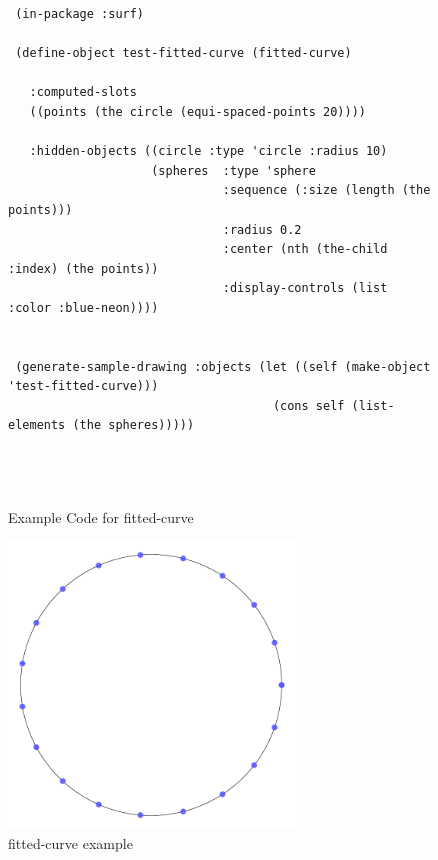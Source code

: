 \documentclass [11pt]{book}
\begin{document}
\begin{itemize}
\begin{figure}
\begin{lrbox}{\boxedverb}
\begin{minipage}{\linewidth}
{\begin{verbatim}
 (in-package :surf)

 (define-object test-fitted-curve (fitted-curve) 
  
   :computed-slots
   ((points (the circle (equi-spaced-points 20))))

   :hidden-objects ((circle :type 'circle :radius 10)
                    (spheres  :type 'sphere
                              :sequence (:size (length (the points)))
                              :radius 0.2
                              :center (nth (the-child :index) (the points))
                              :display-controls (list :color :blue-neon))))


 (generate-sample-drawing :objects (let ((self (make-object 'test-fitted-curve)))
                                     (cons self (list-elements (the spheres)))))


 
\end{verbatim}}
\end{minipage}
\end{lrbox}
\fbox{\usebox{\boxedverb}}

\caption{Example Code for fitted-curve}

\label{fig:example-code-fitted-curve}

\end{figure}

\begin{figure}
\begin{center}
\includegraphics[width=3in,height=3in]{../images/example-fitted-curve.pdf}
\end{center}

\caption{fitted-curve example}

\label{fig:fitted-curve}


\end{figure}
\end{itemize}
\end{document}
